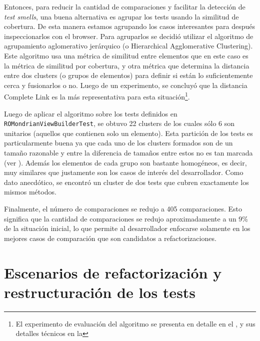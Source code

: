 \par Entonces, para reducir la cantidad de comparaciones y facilitar la detección de \emph{test smells}, una buena alternativa es agrupar los tests usando la similitud de cobertura. De esta manera estamos agrupando los casos interesantes para después inspeccionarlos con el browser. Para agruparlos se decidió utilizar el algoritmo de agrupamiento aglomerativo jerárquico (o Hierarchical Agglomerative Clustering). Este algoritmo usa una métrica de similitud entre elementos que en este caso es la métrica de similitud por cobertura, y otra métrica que determina la distancia entre dos clusters (o grupos de elementos) para definir si están lo suficientemente cerca y fusionarlos o no. Luego de un experimento, se concluyó que la distancia Complete Link es la más representativa para esta situación\footnote{El experimento de evaluación del algoritmo se presenta en detalle en el , y sus detalles técnicos en la  }.

\par Luego de aplicar el algoritmo sobre los tests definidos en {\tt ROMondrianViewBuilderTest}, se obtuvo 22 clusters de los cuales sólo 6 son unitarios (\ie aquellos que contienen solo un elemento). Esta partición de los tests es particularmente buena ya que cada uno de los clusters formados son de un tamaño razonable y entre la diferencia de tamaños entre estos no es tan marcada (ver ). Además los elementos de cada grupo son bastante homogéneos, es decir, muy similares que justamente son los casos de interés del desarrollador. Como dato anecdótico, se encontró un cluster de dos tests que cubren exactamente los mismos métodos. 


\par Finalmente, el número de comparaciones se redujo a 405 comparaciones. Esto significa que la cantidad de comparaciones se redujo aproximadamente a un 9\% de la situación inicial, lo que permite al desarrollador enfocarse solamente en los mejores casos de comparación que son candidatos a refactorizaciones.

\section{Escenarios de refactorización y restructuración de los tests}

